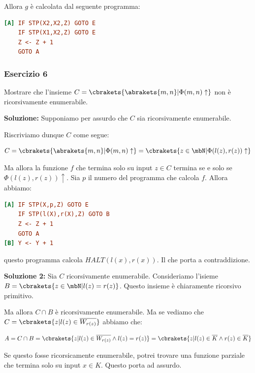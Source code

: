 Allora \(g\) è calcolata dal seguente programma:

\begin{lstlisting}[language=ini, caption={ }]
[A] IF STP(X2,X2,Z) GOTO E
    IF STP(X1,X2,Z) GOTO E
    Z <- Z + 1
    GOTO A
\end{lstlisting}

\newpage
\subsubsection{Esercizio 6}

Mostrare che l'insieme \(C=\cbrakets{\abrakets{m,n} \vert \Phi(m,n) \uparrow}\) non è ricorsivamente enumerabile.

\textbf{Soluzione: } Supponiamo per assurdo che \(C\) sia ricorsivamente enumerabile.

Riscriviamo dunque \(C\) come segue:

\begin{equation}
  C=\cbrakets{\abrakets{m,n} \vert \Phi(m,n) \uparrow}=\cbrakets{z \in \mbN \vert \Phi(l(z),r(z)) \uparrow}
\end{equation}

Ma allora la funzione \(f\) che termina solo su input \(z \in C\) termina se e solo se \(\Phi(l(z),r(z)) \uparrow\). Sia \(p\) il numero del programma che calcola \(f\). Allora abbiamo:

\begin{lstlisting}[language=ini, caption={ }]
[A] IF STP(X,p,Z) GOTO E
    IF STP(l(X),r(X),Z) GOTO B
    Z <- Z + 1
    GOTO A
[B] Y <- Y + 1
\end{lstlisting}

questo programma calcola \(HALT(l(x), r(x))\). Il che porta a contraddizione.

\textbf{Soluzione 2: } Sia \(C\) ricorsivamente enumerabile. Consideriamo l'isieme \(B=\cbrakets{z \in \mbN \vert l(z) = r(z)}\). Questo insieme è chiaramente ricorsivo primitivo.

Ma allora \(C \cap B\) è ricorsivamente enumerabile. Ma se vediamo che \(C=\cbrakets{z \vert l(z) \in \overline{W_{r(z)}}}\) abbiamo che:

\begin{equation}
  A = C \cap B = \cbrakets{z \vert l(z) \in \overline{W_{r(z)}} \land l(z) = r(z)} = \cbrakets{z \vert l(z) \in \overline{K} \land r(z) \in \overline{K}}
\end{equation}

Se questo fosse ricorsicamente enumerabile, potrei trovare una funzione parziale che termina solo su input \(x \in K\). Questo porta ad assurdo.

